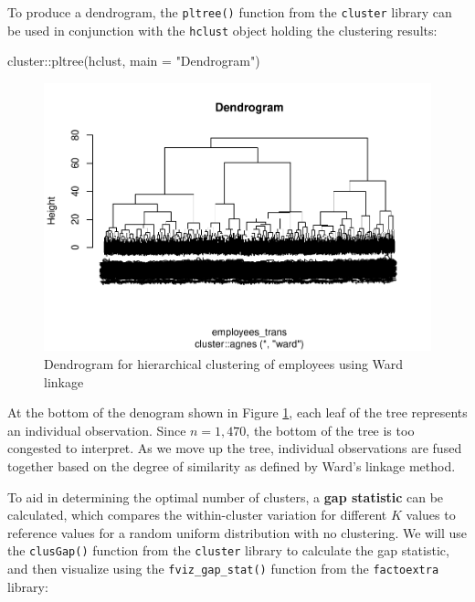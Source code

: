 \documentclass[
]{book}
\newenvironment{Shaded}{\begin{snugshade}}{\end{snugshade}}
\newcommand{\AttributeTok}[1]{\textcolor[rgb]{0.77,0.63,0.00}{#1}}
\newcommand{\FunctionTok}[1]{\textcolor[rgb]{0.00,0.00,0.00}{#1}}
\newcommand{\NormalTok}[1]{#1}
\newcommand{\SpecialCharTok}[1]{\textcolor[rgb]{0.00,0.00,0.00}{#1}}
\newcommand{\StringTok}[1]{\textcolor[rgb]{0.31,0.60,0.02}{#1}}
\begin{document}
To produce a dendrogram, the \texttt{pltree()} function from the \texttt{cluster} library can be used in conjunction with the \texttt{hclust} object holding the clustering results:

\begin{Shaded}
\begin{Highlighting}[]
\NormalTok{cluster}\SpecialCharTok{::}\FunctionTok{pltree}\NormalTok{(hclust, }\AttributeTok{main =} \StringTok{"Dendrogram"}\NormalTok{)}
\end{Highlighting}
\end{Shaded}

\begin{figure}

{\centering \includegraphics[width=1\linewidth]{The_Fundamentals_of_People_Analytics_files/figure-latex/hclust-dendrogram-1} 

}

\caption{Dendrogram for hierarchical clustering of employees using Ward linkage}\label{fig:hclust-dendrogram}
\end{figure}

At the bottom of the denogram shown in Figure \ref{fig:hclust-dendrogram}, each leaf of the tree represents an individual observation. Since \(n = 1,470\), the bottom of the tree is too congested to interpret. As we move up the tree, individual observations are fused together based on the degree of similarity as defined by Ward's linkage method.

To aid in determining the optimal number of clusters, a \textbf{gap statistic} can be calculated, which compares the within-cluster variation for different \(K\) values to reference values for a random uniform distribution with no clustering. We will use the \texttt{clusGap()} function from the \texttt{cluster} library to calculate the gap statistic, and then visualize using the \texttt{fviz\_gap\_stat()} function from the \texttt{factoextra} library:
\end{document}
